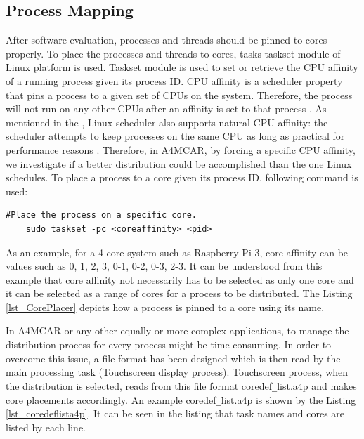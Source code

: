 \subsection{Process Mapping}
After software evaluation, processes and threads should be pinned to cores properly. To place the processes and threads to cores, tasks taskset module of Linux platform is used. Taskset module \cite{taskset} is used to set or retrieve the CPU affinity of a running process given its process ID. CPU affinity is a scheduler property that pins a process to a given set of CPUs on the system. Therefore, the process will not run on any other CPUs after an affinity is set to that process \cite{taskset}. As mentioned in the \cite{taskset}, Linux scheduler also supports natural CPU affinity: the scheduler attempts to keep processes on the same CPU as long as practical for performance reasons \cite{taskset}. Therefore, in A4MCAR, by forcing a specific CPU affinity, we investigate if a better distribution could be accomplished than the one Linux schedules. To place a process to a core given its process ID, following command is used:

\begin{lstlisting}[style=bash]
	#Place the process on a specific core.
	sudo taskset -pc <coreaffinity> <pid>
\end{lstlisting}

As an example, for a 4-core system such as Raspberry Pi 3, core affinity can be values such as 0, 1, 2, 3, 0-1, 0-2, 0-3, 2-3. It can be understood from this example that core affinity not necessarily has to be selected as only one core and it can be selected as a range of cores for a process to be distributed. The Listing \ref{lst_CorePlacer} depicts how a process is pinned to a core using its name.


In A4MCAR or any other equally or more complex applications, to manage the distribution process for every process might be time consuming. In order to overcome this issue, a file format has been designed which is then read by the main processing task (Touchscreen display process). Touchscreen process, when the distribution is selected, reads from this file format coredef\texttt{\_}list.a4p and makes core placements accordingly. An example coredef\texttt{\_}list.a4p is shown by the Listing \ref{lst_coredeflista4p}. It can be seen in the listing that task names and cores are listed by each line.


